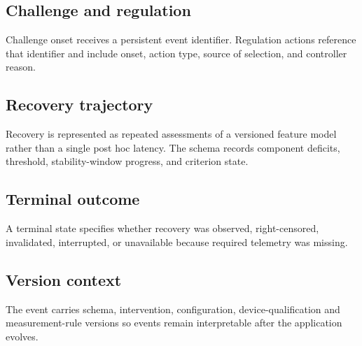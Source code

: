 \subsection{Challenge and regulation}
Challenge onset receives a persistent event identifier. Regulation actions reference that identifier and include onset, action type, source of selection, and controller reason.

\subsection{Recovery trajectory}
Recovery is represented as repeated assessments of a versioned feature model rather than a single post hoc latency. The schema records component deficits, threshold, stability-window progress, and criterion state.

\subsection{Terminal outcome}
A terminal state specifies whether recovery was observed, right-censored, invalidated, interrupted, or unavailable because required telemetry was missing.

\subsection{Version context}
The event carries schema, intervention, configuration, device-qualification and measurement-rule versions so events remain interpretable after the application evolves.
